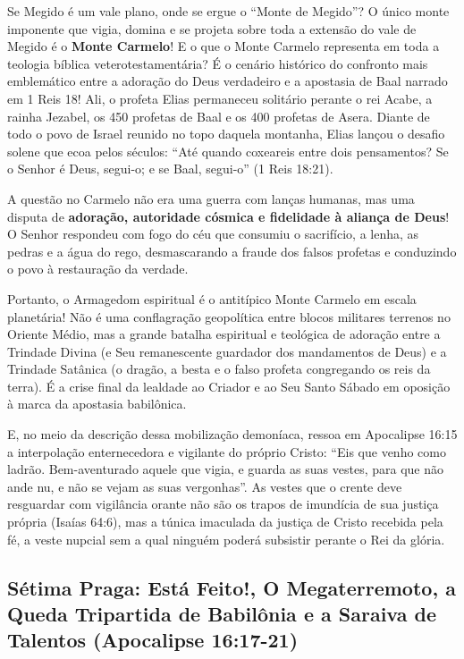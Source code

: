 \documentclass[11pt,a4paper,openany]{book}
\begin{document}
Se Megido é um vale plano, onde se ergue o ``Monte de Megido''?
O único monte imponente que vigia, domina e se projeta sobre toda a extensão do vale de Megido é o \textbf{Monte Carmelo}!
E o que o Monte Carmelo representa em toda a teologia bíblica veterotestamentária? É o cenário histórico do confronto mais emblemático entre a adoração do Deus verdadeiro e a apostasia de Baal narrado em 1 Reis 18! Ali, o profeta Elias permaneceu solitário perante o rei Acabe, a rainha Jezabel, os 450 profetas de Baal e os 400 profetas de Asera. Diante de todo o povo de Israel reunido no topo daquela montanha, Elias lançou o desafio solene que ecoa pelos séculos:
``Até quando coxeareis entre dois pensamentos? Se o Senhor é Deus, segui-o; e se Baal, segui-o'' (1 Reis 18:21).

A questão no Carmelo não era uma guerra com lanças humanas, mas uma disputa de \textbf{adoração, autoridade cósmica e fidelidade à aliança de Deus}! O Senhor respondeu com fogo do céu que consumiu o sacrifício, a lenha, as pedras e a água do rego, desmascarando a fraude dos falsos profetas e conduzindo o povo à restauração da verdade.

Portanto, o Armagedom espiritual é o antitípico Monte Carmelo em escala planetária! Não é uma conflagração geopolítica entre blocos militares terrenos no Oriente Médio, mas a grande batalha espiritual e teológica de adoração entre a Trindade Divina (e Seu remanescente guardador dos mandamentos de Deus) e a Trindade Satânica (o dragão, a besta e o falso profeta congregando os reis da terra). É a crise final da lealdade ao Criador e ao Seu Santo Sábado em oposição à marca da apostasia babilônica.

E, no meio da descrição dessa mobilização demoníaca, ressoa em Apocalipse 16:15 a interpolação enternecedora e vigilante do próprio Cristo:
``Eis que venho como ladrão. Bem-aventurado aquele que vigia, e guarda as suas vestes, para que não ande nu, e não se vejam as suas vergonhas''.
As vestes que o crente deve resguardar com vigilância orante não são os trapos de imundícia de sua justiça própria (Isaías 64:6), mas a túnica imaculada da justiça de Cristo recebida pela fé, a veste nupcial sem a qual ninguém poderá subsistir perante o Rei da glória.



\subsection{Sétima Praga: Está Feito!, O Megaterremoto, a Queda Tripartida de Babilônia e a Saraiva de Talentos (Apocalipse 16:17-21)}
\end{document}
